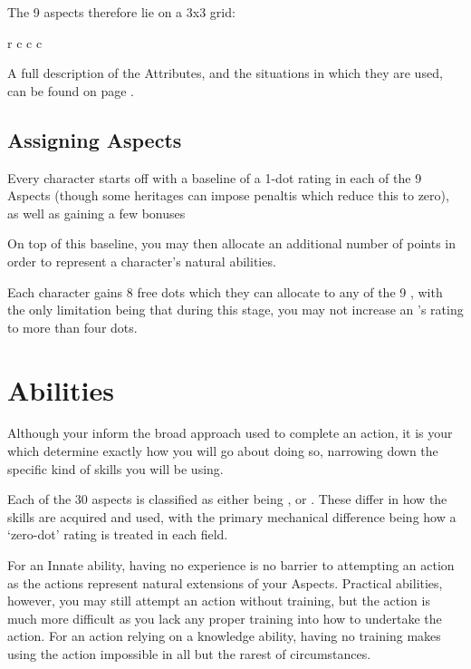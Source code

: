 The 9 aspects therefore lie on a 3x3 grid:

\begin{center}
	\begin{rndtable}{r c c c}
	\end{rndtable}
\end{center}

A full description of the Attributes, and the situations in which they are used, can be found on page \pageref{S:Proficiencies}.

\subsection{Assigning Aspects}

Every character starts off with a baseline of a 1-dot rating in each of the 9 Aspects (though some  heritages can impose penaltis which reduce this to zero), as well as gaining a few bonuses 

On top of this baseline, you may then allocate an additional number of points in order to represent a character's natural abilities.

Each character gains 8 free dots which they can allocate to any of the 9 , with the only limitation being that during this stage, you may not increase an 's rating to more than four dots. 


\section{Abilities}

Although your  inform the broad approach used to complete an action, it is your  which determine exactly how you will go about doing so, narrowing down the specific kind of skills you will be using. 

Each of the 30 aspects is classified as either being ,  or . These differ in how the skills are acquired and used, with the primary mechanical difference being how a `zero-dot' rating is treated in each field. 

For an Innate ability, having no experience is no barrier to attempting an action as the actions represent natural extensions of your Aspects. Practical abilities, however, you may still attempt an action without training, but the action is much more difficult as you lack any proper training into how to undertake the action. For an action relying on a knowledge ability, having no training makes using the action impossible in all but the rarest of circumstances.

